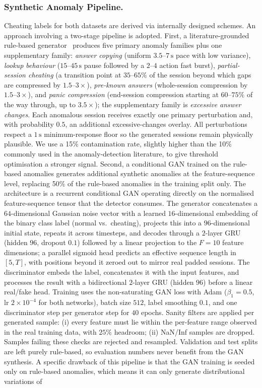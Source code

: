 \documentclass[sigconf]{acmart}
\begin{document}
\subsubsection{Synthetic Anomaly Pipeline.}
Cheating labels for both datasets are derived via internally designed schemes. An approach involving a two-stage pipeline is adopted. First, a literature-grounded rule-based generator~\cite{ruiperez2017detection, alexandron2019fraud} produces five primary anomaly families plus one supplementary family: \emph{answer copying} (uniform $3.5$--$7\,\mathrm{s}$ pace with low variance), \emph{lookup behaviour} ($15$--$45\,\mathrm{s}$ pause followed by a $2$--$4$ action fast burst), \emph{partial-session cheating} (a transition point at $35$--$65\%$ of the session beyond which gaps are compressed by $1.5$--$3\times$), \emph{pre-known answers} (whole-session compression by $1.5$--$3\times$), and \emph{panic compression} (end-session compression starting at $60$--$75\%$ of the way through, up to $3.5\times$); the supplementary family is \emph{excessive answer changes}. Each anomalous session receives exactly one primary perturbation and, with probability $0.5$, an additional excessive-changes overlay. All perturbations respect a $1\,\mathrm{s}$ minimum-response floor so the generated sessions remain physically plausible. We use a 15\% contamination rate, slightly higher than the 10\% commonly used in the anomaly-detection literature, to give threshold optimisation a stronger signal. Second, a conditional GAN trained on the rule-based anomalies generates additional synthetic anomalies at the feature-sequence level, replacing 50\% of the rule-based anomalies in the training split only. The architecture is a recurrent conditional GAN operating directly on the normalised feature-sequence tensor that the detector consumes. The generator concatenates a $64$-dimensional Gaussian noise vector with a learned $16$-dimensional embedding of the binary class label (normal vs.\ cheating), projects this into a $96$-dimensional initial state, repeats it across timesteps, and decodes through a $2$-layer GRU (hidden $96$, dropout $0.1$) followed by a linear projection to the $F = 10$ feature dimensions; a parallel sigmoid head predicts an effective sequence length in $[5, T]$, with positions beyond it zeroed out to mirror real padded sessions. The discriminator embeds the label, concatenates it with the input features, and processes the result with a bidirectional $2$-layer GRU (hidden $96$) before a linear real/fake head. Training uses the non-saturating GAN loss with Adam ($\beta_1=0.5$, lr $2\times 10^{-4}$ for both networks), batch size $512$, label smoothing $0.1$, and one discriminator step per generator step for $40$ epochs. Sanity filters are applied per generated sample: (i) every feature must lie within the per-feature range observed in the real training data, with $25\%$ headroom; (ii) NaN/Inf samples are dropped. Samples failing these checks are rejected and resampled. Validation and test splits are left purely rule-based, so evaluation numbers never benefit from the GAN synthesis. A specific drawback of this pipeline is that the GAN training is seeded only on rule-based anomalies, which means it can only generate distributional variations of 
\end{document}
